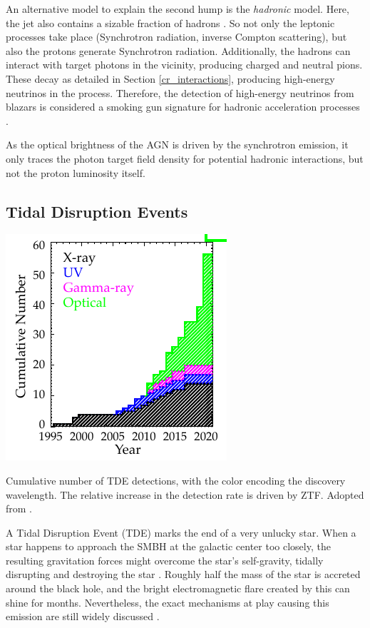 \documentclass[
    a4paper, %
    fontsize=10pt, %
    twoside=false, %
    numbers=noenddot, %
    fontmethod=tex,
]{kaobook}
\begin{document}
An alternative model to explain the second hump is the \textit{hadronic} model. Here, the jet also contains a sizable fraction of hadrons . So not only the leptonic processes take place (Synchrotron radiation, inverse Compton scattering), but also the protons generate Synchrotron radiation. Additionally, the hadrons can interact with target photons in the vicinity, producing charged and neutral pions. These decay as detailed in Section \ref{cr_interactions}, producing high-energy neutrinos in the process. Therefore, the detection of high-energy neutrinos from blazars is considered a smoking gun signature for hadronic acceleration processes .

As the optical brightness of the AGN is driven by the synchrotron emission, it only traces the photon target field density for potential hadronic interactions, but not the proton luminosity itself.

\subsection{Tidal Disruption Events}

\begin{marginfigure}
    \includegraphics{theory/tde_cumulative.pdf}
    \caption[TDE detections]{Cumulative number of TDE detections, with the color encoding the discovery wavelength. The relative increase in the detection rate is driven by ZTF. Adopted from \cite{Gezari2021}.}
\end{marginfigure}

A Tidal Disruption Event (TDE) marks the end of a very unlucky star. When a star happens to approach the SMBH at the galactic center too closely, the resulting gravitation forces might overcome the star's self-gravity, tidally disrupting and destroying the star . Roughly half the mass of the star is accreted around the black hole, and the bright electromagnetic flare created by this can shine for months. Nevertheless, the exact mechanisms at play causing this emission are still widely discussed .
\end{document}
